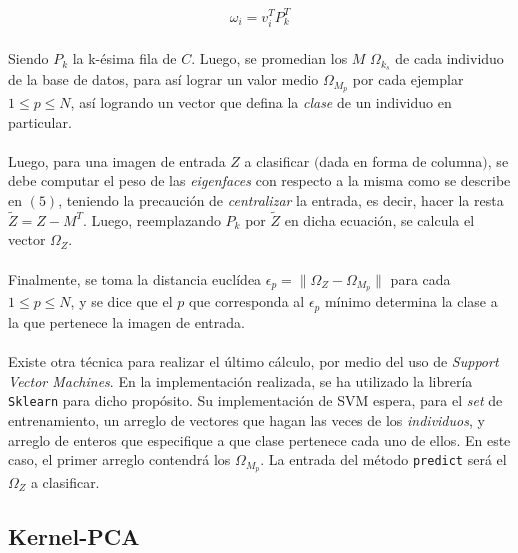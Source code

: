 \documentclass[12pt, twocolumn]{article}
\begin{document}
	\begin{align}
		\omega_{i} = v_{i}^{T}P_{k}^{T}
	\end{align}
	
	\paragraph{} Siendo $P_{k}$ la k-ésima fila de $C$. Luego, se promedian los $M$ $\Omega_{k_{s}}$ de cada individuo de la base de datos, para así lograr un valor medio $\Omega_{M_{p}}$ por cada ejemplar $1 \le p \le N$, así logrando un vector que defina la \textit{clase} de un individuo en particular.
	
	\paragraph{} Luego, para una imagen de entrada $Z$ a clasificar $($dada en forma de columna$)$, se debe computar el peso de las \textit{eigenfaces} con respecto a la misma como se describe en $(5)$, teniendo la precaución de \textit{centralizar} la entrada, es decir, hacer la resta $\widetilde{Z} = Z - M^{T}$. Luego, reemplazando $P_{k}$ por $\widetilde{Z}$ en dicha ecuación, se calcula el vector $\Omega_{Z}$.
	
	\paragraph{} Finalmente, se toma la distancia euclídea $\epsilon_{p} = \lVert \Omega_{Z} - \Omega_{M_{p}} \rVert$ para cada $1 \le p \le N$, y se dice que el $p$ que corresponda al $\epsilon_{p}$ mínimo determina la clase a la que pertenece la imagen de entrada. 
	
	\paragraph{} Existe otra técnica para realizar el último cálculo, por medio del uso de \textit{Support Vector Machines}. En la implementación realizada, se ha utilizado la librería \verb|Sklearn| para dicho propósito. Su implementación de SVM espera, para el \textit{set} de entrenamiento, un arreglo de vectores que hagan las veces de los \textit{individuos}, y arreglo de enteros que especifique a que clase pertenece cada uno de ellos. En este caso, el primer arreglo contendrá los $\Omega_{M_{p}}$. La entrada del método \verb|predict| será el $\Omega_{Z}$ a clasificar. 
	
	\subsection{Kernel-PCA}
	
\end{document}
